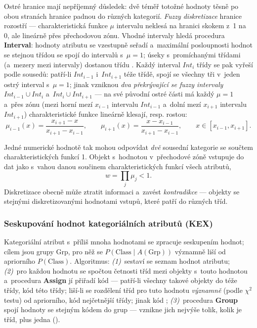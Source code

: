 \documentclass[11pt,a4paper]{article}
\theoremstyle{definition}
\begin{document}
Ostré hranice mají nepříjemný důsledek: dvě téměř totožné hodnoty těsně po obou stranách
hranice padnou do různých kategorií. \emph{Fuzzy diskretizace} hranice rozostří ---
charakteristická funkce $\mu$ intervalu neklesá na hranici skokem z~1 na 0, ale lineárně
přes přechodovou zónu. Vhodné intervaly hledá procedura \textbf{Interval}: hodnoty
atributu se vzestupně seřadí a~maximální posloupnosti hodnot se stejnou třídou se spojí do
intervalů s~$\mu=1$; úseky s~promíchanými třídami (a~mezery mezi intervaly) dostanou třídu
. Každý interval $Int_i$ třídy  se pak vyřeší podle sousedů: patří-li
$Int_{i-1}$ i~$Int_{i+1}$ téže třídě, spojí se všechny tři v~jeden ostrý interval
s~$\mu=1$; jinak vzniknou \emph{dva překrývající se fuzzy intervaly}
$Int_{i-1}\cup Int_i$ a~$Int_i\cup Int_{i+1}$ --- na své původní ostré části má každý
$\mu=1$ a~přes zónu  (mezi horní mezí $x_{i-1}$ intervalu $Int_{i-1}$ a~dolní mezí
$x_{i+1}$ intervalu $Int_{i+1}$) charakteristické funkce lineárně klesají, resp. rostou:
\[ \mu_{i-1}(x)=\frac{x_{i+1}-x}{x_{i+1}-x_{i-1}},\qquad
   \mu_{i+1}(x)=\frac{x-x_{i-1}}{x_{i+1}-x_{i-1}},\qquad x\in[x_{i-1},x_{i+1}]. \]

Jedné numerické hodnotě tak mohou odpovídat \emph{dvě} sousední kategorie se součtem
charakteristických funkcí 1. Objekt s~hodnotou v~přechodové zóně vstupuje do dat jako
 s~vahou danou součinem charakteristických funkcí všech atributů,
\[ w = \prod_j \mu_j < 1. \]
Diskretizace obecně může ztratit informaci a~zavést \emph{kontradikce} --- objekty se
stejnými diskretizovanými hodnotami vstupů, které patří do různých tříd.

\subsubsection{Seskupování hodnot kategoriálních atributů (KEX)}

Kategoriální atribut s~příliš mnoha hodnotami se zpracuje seskupením hodnot; cílem jsou
grupy $\mathrm{Grp}$, pro něž se $P(\mathrm{Class}\mid A(\mathrm{Grp}))$ významně liší od
apriorního $P(\mathrm{Class})$. Algoritmus: \emph{(1)}~sestaví se seznam hodnot atributu;
\emph{(2)}~pro každou hodnotu se spočtou četnosti tříd mezi objekty s~touto hodnotou
a~procedura \textbf{Assign} jí přiřadí kód --- patří-li všechny takové objekty do téže
třídy, kód této třídy; liší-li se rozdělení tříd pro tuto hodnotu \emph{významně} (podle
$\chi^2$ testu) od apriorního, kód nejčetnější třídy; jinak kód ;
\emph{(3)}~procedura \textbf{Group} spojí hodnoty se stejným kódem do grup --- vznikne
jich nejvýše tolik, kolik je tříd, plus jedna ().
\end{document}
